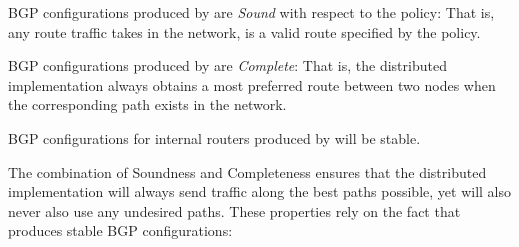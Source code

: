 \begin{prop}
BGP configurations produced by \sysname are \textit{Sound} with respect to the policy: That is, any route traffic takes in the network, is a valid route specified by the policy.
\end{prop}
%
%
\begin{prop}
BGP configurations produced by \sysname are \textit{Complete}: That is, the distributed implementation always obtains a most preferred route between two nodes when the corresponding path exists in the network.
\end{prop}
%
%
%
\begin{prop}
BGP configurations for internal routers produced by \sysname will be stable. 
\end{prop}
%
The combination of Soundness and Completeness ensures that the distributed implementation will always send traffic along the best paths possible, yet will also never also use any undesired paths. These properties rely on the fact that \sysname produces stable BGP configurations:
%
